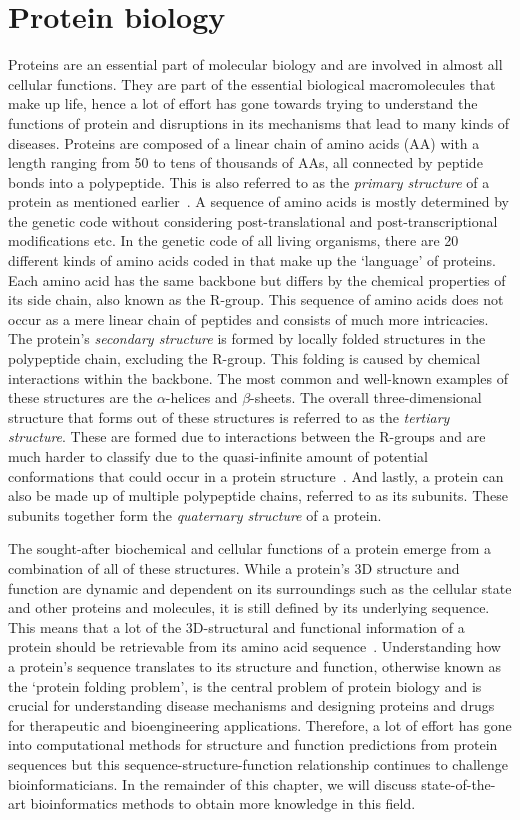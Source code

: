 \section{Protein biology}
Proteins are an essential part of molecular biology and are involved in almost all cellular functions. They are part of the essential biological macromolecules that make up life, hence a lot of effort has gone towards trying to understand the functions of protein and disruptions in its mechanisms that lead to many kinds of diseases. Proteins are composed of a linear chain of amino acids (AA) with a length ranging from 50 to tens of thousands of AAs, all connected by peptide bonds into a polypeptide. This is also referred to as the \textit{primary structure} of a protein as mentioned earlier~\cite{primstruct}. A sequence of amino acids is mostly determined by the genetic code without considering post-translational and post-transcriptional modifications etc. In the genetic code of all living organisms, there are 20 different kinds of amino acids coded in that make up the `language' of proteins. Each amino acid has the same backbone but differs by the chemical properties of its side chain, also known as the R-group. This sequence of amino acids does not occur as a mere linear chain of peptides and consists of much more intricacies. The protein's \textit{secondary structure} is formed by locally folded structures in the polypeptide chain, excluding the R-group. This folding is caused by chemical interactions within the backbone. The most common and well-known examples of these structures are the $\alpha$-helices and $\beta$-sheets. The overall three-dimensional structure that forms out of these structures is referred to as the \textit{tertiary structure}. These are formed due to interactions between the R-groups and are much harder to classify due to the quasi-infinite amount of potential conformations that could occur in a protein structure~\cite{folding}. And lastly, a protein can also be made up of multiple polypeptide chains, referred to as its subunits. These subunits together form the \textit{quaternary structure} of a protein.

The sought-after biochemical and cellular functions of a protein emerge from a combination of all of these structures. While a protein's 3D structure and function are dynamic and dependent on its surroundings such as the cellular state and other proteins and molecules, it is still defined by its underlying sequence. This means that a lot of the 3D-structural and functional information of a protein should be retrievable from its amino acid sequence~\cite{structure}. Understanding how a protein's sequence translates to its structure and function, otherwise known as the `protein folding problem', is the central problem of protein biology and is crucial for understanding disease mechanisms and designing proteins and drugs for therapeutic and bioengineering applications. Therefore, a lot of effort has gone into computational methods for structure and function predictions from protein sequences but this sequence-structure-function relationship continues to challenge bioinformaticians. In the remainder of this chapter, we will discuss state-of-the-art bioinformatics methods to obtain more knowledge in this field.

